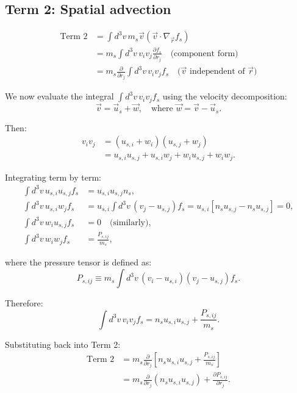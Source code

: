\subsection*{Term 2: Spatial advection}

\begin{align*}
\text{Term 2} &= \int d^3v \, m_s \vec{v} (\vec{v} \cdot \nabla_{\vec{r}} f_s)  \\
&= m_s \int d^3v \, v_i v_j \frac{\partial f_s}{\partial r_j} \quad \text{(component form)}  \\
&= m_s \frac{\partial}{\partial r_j} \int d^3v \, v_i v_j f_s \quad \text{($\vec{v}$ independent of $\vec{r}$)}
\end{align*}

We now evaluate the integral $\int d^3v \, v_i v_j f_s$ using the velocity decomposition:
\begin{equation*}
\vec{v} = \vec{u}_s + \vec{w}, \quad \text{where } \vec{w} = \vec{v} - \vec{u}_s.
\end{equation*}

Then:
\begin{align*}
v_i v_j &= (u_{s,i} + w_i)(u_{s,j} + w_j)  \\
&= u_{s,i} u_{s,j} + u_{s,i} w_j + w_i u_{s,j} + w_i w_j.
\end{align*}

Integrating term by term:
\begin{align*}
\int d^3v \, u_{s,i} u_{s,j} f_s &= u_{s,i} u_{s,j} n_s, \\
\int d^3v \, u_{s,i} w_j f_s &= u_{s,i} \int d^3v \, (v_j - u_{s,j}) f_s = u_{s,i}[n_s u_{s,j} - n_s u_{s,j}] = 0, \\
\int d^3v \, w_i u_{s,j} f_s &= 0 \quad \text{(similarly)} , \\
\int d^3v \, w_i w_j f_s &= \frac{P_{s,ij}}{m_s},
\end{align*}

where the pressure tensor is defined as:
\begin{equation*}
P_{s,ij} \equiv m_s \int d^3v \, (v_i - u_{s,i})(v_j - u_{s,j}) f_s.
\end{equation*}

Therefore:
\begin{equation*}
\int d^3v \, v_i v_j f_s = n_s u_{s,i} u_{s,j} + \frac{P_{s,ij}}{m_s}.
\end{equation*}

Substituting back into Term 2:
\begin{align*}
\text{Term 2} &= m_s \frac{\partial}{\partial r_j} \left[ n_s u_{s,i} u_{s,j} + \frac{P_{s,ij}}{m_s} \right]  \\
&= m_s \frac{\partial}{\partial r_j} (n_s u_{s,i} u_{s,j}) + \frac{\partial P_{s,ij}}{\partial r_j}.
\end{align*}

